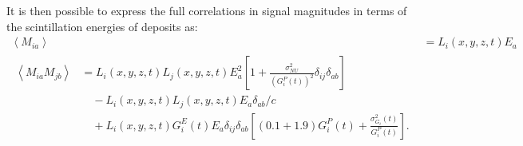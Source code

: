 It is then possible to express the full correlations in signal magnitudes in terms of the scintillation energies of deposits as:
\begin{align*}
\left< M_{ia} \right> &= L_i(x,y,z,t) E_a \\
\begin{split}
\left< M_{ia} M_{jb} \right> &= L_i(x,y,z,t)L_j(x,y,z,t) E^2_a \left[1 + \frac{\sigma^2_{NU}}{\left(G^P_i(t)\right)^2} \delta_{ij}\delta_{ab} \right] \\
&\quad - L_i(x,y,z,t) L_j(x,y,z,t) E_a \delta_{ab}/c \\
&\quad + L_i(x,y,z,t) G^E_i(t) E_a \delta_{ij} \delta_{ab} \left[\left(0.1 + 1.9\right)G^P_i(t) + \frac{\sigma^2_{G_i}(t)}{G^P_i(t)}\right].
\end{split}\end{align*}

